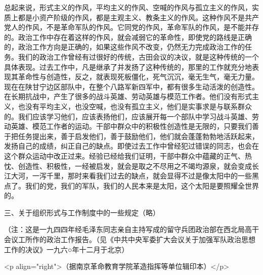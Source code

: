 总起来说，形式主义的作风，平均主义的作风、空喊的作风与孤立主义的作风，实质上都是小资产阶级的作风，都是主观主义、教条主义的作风。这种作风不是共产党人的作风，不是革命军队的作风。它同党的作风，革命军队的作风，是不能并存的。政治工作中存在着这样的作风，就会减弱它的革命性，即使党的路线是正确的，政治工作方向是正确的，如果这些作风不改变，仍然无力完成政治工作的任务。我们的政治工作曾经有过很好的传统，古田会议的决议，就是这种传统的一个具体表现。过去工作中，凡是继承了并发扬了这种传统的，那里的工作就充分地表现其革命性与创造性，反之，就表现死板僵化，死气沉沉，毫无生气，毫无力量。现在在陕甘宁边区部队中，在整个八路军新四军中，都有很多生动活泼的创造性。在长期抗战中，产生了很多的战斗英雄、劳动英雄与模范工作者。他们没有形式主义，也没有平均主义，也没空喊，也没有孤立主义，他们是实事求是与联系群众的。我们应该学习他们，应该表扬他们，应该展开每一个部队中学习战斗英雄、劳动英雄、模范工作者的运动。干部中群众中的积极性创造性是无限的，只要我们善于把任务提出来，善于启发他们，善于鼓励他们，他们就会蓬蓬勃勃地活跃起来，发扬自己的成绩，纠正自己的缺点。即使过去工作中曾经犯过错误的同志，也会在这个群众运动中改正过来。经验已经给我们证明，干部中群众中蕴藏的正气、热忱、创造性、积极性，一经被启发，就会是取之不尽用之不竭均源泉，就会变成长江大河，一泻千里，那时来看我们过去的缺点，就会显得不过是像太阳中的一些黑点了。我们的党，我们的军队，我们的人民本来是太阳，这个太阳是要照耀全世界的。

三、关于组织形式与工作制度中的一些规定（略）

（注：这是一九四四年经毛泽东同志亲自主持写成的留守兵团政治部在西北局高干会议工所作的政治工作报告。（见《中共中央军委扩大会议关于加强军队政治思想工作的决议》一九六○年十二月于北京）

<p align="right">（据南京革命教育学院革造指挥等单位辑印本）</p>

